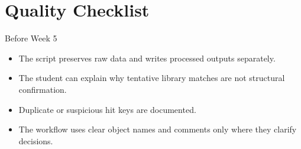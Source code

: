 \section{Quality Checklist}
\begin{checklistbox}{Before Week 5}
\begin{itemize}
  \item The script preserves raw data and writes processed outputs separately.
  \item The student can explain why tentative library matches are not structural confirmation.
  \item Duplicate or suspicious hit keys are documented.
  \item The workflow uses clear object names and comments only where they clarify decisions.
\end{itemize}
\end{checklistbox}
